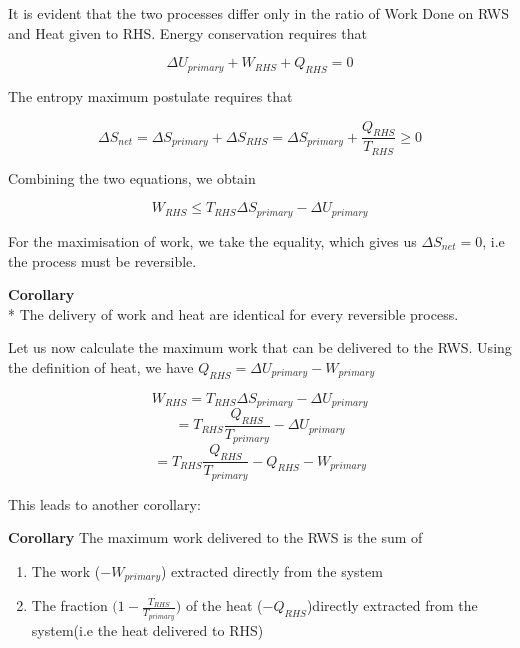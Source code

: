 \documentclass[oneside]{book}
\begin{document}
It is evident that the two processes differ only in the ratio of Work Done on RWS and Heat given to RHS. Energy conservation requires that

\[ \Delta U_{primary} + W_{RHS} + Q_{RHS} = 0 \]

The entropy maximum postulate requires that 

\[ \Delta S_{net} = \Delta S_{primary} + \Delta S_{RHS}  = \Delta S_{primary}  + \frac{Q_{RHS}}{T_{RHS}} \geq0 \]

Combining the two equations, we obtain

\[ W_{RHS} \leq T_{RHS} \Delta S_{primary} - \Delta U_{primary} \]

For the maximisation of work, we take the equality, which gives us $\Delta S_{net} = 0$, i.e the process must be reversible.

	\begin{mdframed}[style=exercise]
\textbf{Corollary}
 \\* The delivery of work and heat are identical for every reversible process.
 \end{mdframed}
 
 Let us now calculate the maximum work that can be delivered to the RWS. Using the definition of heat, we have $Q_{RHS} = \Delta U_{primary} - W_{primary} $
 
 \[ W_{RHS} = T_{RHS} \Delta S_{primary} - \Delta U_{primary} \]
 \[= T_{RHS} \frac {Q_{RHS}} {T_{primary}} - \Delta U_{primary} \]
 \[= T_{RHS} \frac {Q_{RHS}} {T_{primary}} - Q_{RHS} - W_{primary} \]
 \begin{center}
  \end{center}
  
\vspace{1cm}
This leads to another corollary: 
	\begin{mdframed}[style=exercise]
\textbf{Corollary}
The maximum work delivered to the RWS is the sum of
\begin{enumerate}
    	\setcounter{enumi}{0}
	\item The work ($-W_{primary}$) extracted directly from the system
	\item The fraction $ \Bigg(1 - \frac {T_{RHS}} {T_{primary}}\Bigg) $ of the heat ($-Q_{RHS}$)directly extracted from the system(i.e the heat delivered to RHS)
\end{enumerate}
 \end{mdframed}
\end{document}

